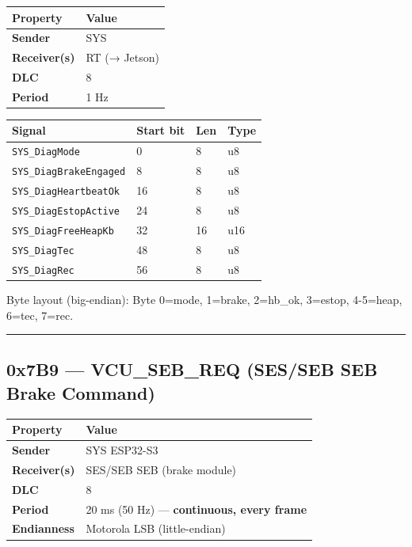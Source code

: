 \begin{longtable}[]{@{}ll@{}}
\toprule\noalign{}
Property & Value \\
\midrule\noalign{}
\endhead
\bottomrule\noalign{}
\endlastfoot
\textbf{Sender} & SYS \\
\textbf{Receiver(s)} & RT (→ Jetson) \\
\textbf{DLC} & 8 \\
\textbf{Period} & 1 Hz \\
\end{longtable}

\begin{longtable}[]{@{}llll@{}}
\toprule\noalign{}
Signal & Start bit & Len & Type \\
\midrule\noalign{}
\endhead
\bottomrule\noalign{}
\endlastfoot
\texttt{SYS\_DiagMode} & 0 & 8 & u8 \\
\texttt{SYS\_DiagBrakeEngaged} & 8 & 8 & u8 \\
\texttt{SYS\_DiagHeartbeatOk} & 16 & 8 & u8 \\
\texttt{SYS\_DiagEstopActive} & 24 & 8 & u8 \\
\texttt{SYS\_DiagFreeHeapKb} & 32 & 16 & u16 \\
\texttt{SYS\_DiagTec} & 48 & 8 & u8 \\
\texttt{SYS\_DiagRec} & 56 & 8 & u8 \\
\end{longtable}

Byte layout (big-endian): Byte 0=mode, 1=brake, 2=hb\_ok, 3=estop, 4-5=heap,
6=tec, 7=rec.

\begin{center}\rule{0.5\linewidth}{0.5pt}\end{center}

\subsection{0x7B9 --- VCU\_SEB\_REQ (SES/SEB SEB Brake
Command)}\label{x7b9-vcu_seb_req-SES/SEB-seb-brake-command}

\begin{longtable}[]{@{}ll@{}}
\toprule\noalign{}
Property & Value \\
\midrule\noalign{}
\endhead
\bottomrule\noalign{}
\endlastfoot
\textbf{Sender} & SYS ESP32-S3 \\
\textbf{Receiver(s)} & SES/SEB SEB (brake module) \\
\textbf{DLC} & 8 \\
\textbf{Period} & 20 ms (50 Hz) --- \textbf{continuous, every frame} \\
\textbf{Endianness} & Motorola LSB (little-endian) \\
\end{longtable}

